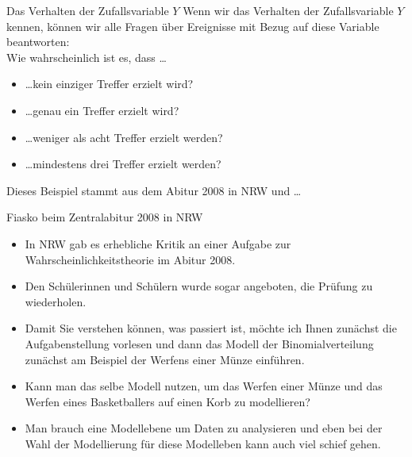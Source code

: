 \documentclass[usenames,dvipsnames,handout]{beamer}
\begin{document}
\begin{frame}{Das Verhalten der Zufallsvariable $Y$}
Wenn wir das Verhalten der Zufallsvariable $Y$ kennen, können wir alle Fragen
über Ereignisse mit Bezug auf diese Variable beantworten:\\
Wie wahrscheinlich ist es, dass \dots
\begin{itemize}
\item{\dots kein einziger Treffer erzielt wird?}
\item{\dots genau ein Treffer erzielt wird?}
\item{\dots weniger als acht Treffer erzielt werden?}
\item{\dots mindestens drei Treffer erzielt werden?}\pause
\end{itemize}
Dieses Beispiel stammt aus dem Abitur 2008 in NRW und \dots
\end{frame}

\begin{frame}{Fiasko beim Zentralabitur 2008 in NRW}
\begin{itemize}
\item{In NRW gab es erhebliche Kritik an einer Aufgabe zur Wahrscheinlichkeitstheorie im Abitur 2008.}\pause
\item{Den Schülerinnen und Schülern wurde sogar angeboten, die Prüfung zu wiederholen.}\pause
\item{Damit Sie verstehen können, was passiert ist, möchte ich Ihnen zunächst die Aufgabenstellung
vorlesen und dann das Modell der Binomialverteilung zunächst am Beispiel der Werfens einer Münze 
einführen.}\pause
\item{Kann man das selbe Modell nutzen, um das Werfen einer Münze und das Werfen eines Basketballers auf einen Korb
zu modellieren?}\pause
\item{Man brauch eine Modellebene um Daten zu analysieren und eben bei der Wahl der Modellierung für diese Modelleben kann auch
viel schief gehen.}
\end{itemize}
\end{frame}
\end{document}
